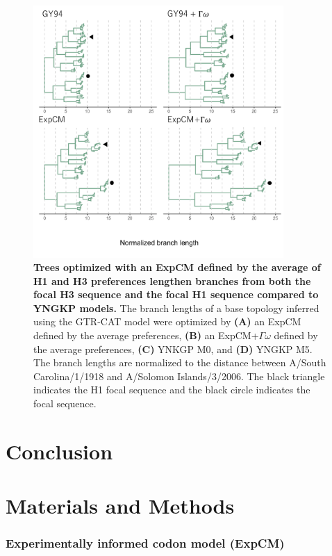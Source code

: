 \documentclass[11pt]{article}
\begin{document}
\begin{figure}
\centerline{\includegraphics[width=0.85\textwidth]{figures/tree_average}}
\caption{\label{fig:tree_average}
\textbf{Trees optimized with an ExpCM defined by the average of H1 and H3 preferences lengthen branches from both the focal H3 sequence and the focal H1 sequence compared to YNGKP models.} 
The branch lengths of a base topology inferred using the GTR-CAT model were optimized by \textbf{(A)} an ExpCM defined by the average preferences, \textbf{(B)} an ExpCM+$\Gamma\omega$ defined by the average preferences, \textbf{(C)} YNKGP M0, and \textbf{(D)} YNGKP M5.
The branch lengths are normalized to the distance between A/South Carolina/1/1918 and A/Solomon Islands/3/2006.
The black triangle indicates the H1 focal sequence and the black circle indicates the focal sequence.
}
\end{figure}

\section*{Conclusion}

\newpage
\section*{Materials and Methods}

\subsubsection*{Experimentally informed codon model (ExpCM)}
\end{document}
